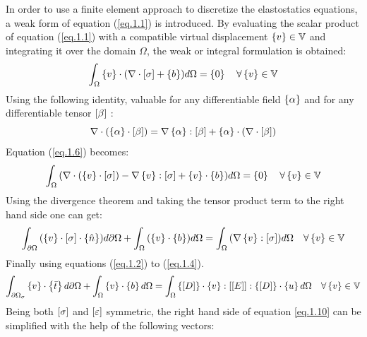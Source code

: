 In order to use a finite element approach to discretize the elastostatics equations, a weak form of equation (\ref{eq.1.1}) is introduced.
By evaluating the scalar product of equation (\ref{eq.1.1}) with a compatible virtual displacement $ \left\lbrace{v}\right \rbrace \in \mathbb{V}$ and integrating it over the domain $\Omega$, the weak or integral formulation is obtained:
\begin{eqnarray}
\label{eq.1.6}
\int_{\Omega}{\left\lbrace{v}\right \rbrace \cdot (\nabla \cdot \left[{\sigma}\right] + \left\lbrace{b}\right \rbrace) d\Omega}=\left\lbrace{0}\right \rbrace \quad \forall \left\lbrace{v}\right \rbrace \in \mathbb{V} 
\end{eqnarray}
Using the following identity, valuable for any differentiable field $\left\lbrace{\alpha}\right \rbrace$ and for any differentiable tensor $ \left[{\beta}\right]$ :
\begin{equation}
\label{eq.1.7}
\nabla \cdot (\left\lbrace{\alpha}\right \rbrace \cdot \left[{\beta}\right])=\nabla \left\lbrace{\alpha}\right \rbrace : \left[{\beta}\right]+\left\lbrace{\alpha}\right \rbrace\cdot(\nabla \cdot \left[{\beta}\right])
\end{equation}
Equation (\ref{eq.1.6})  becomes:
\begin{eqnarray}
\label{eq.1.8}
\int_{\Omega}{(\nabla \cdot (\left\lbrace{v}\right \rbrace \cdot \left[{\sigma}\right]) - \nabla \left\lbrace{v}\right \rbrace :\left[{\sigma}\right]  + \left\lbrace{v}\right \rbrace \cdot \left\lbrace{b}\right \rbrace) d\Omega}=\left\lbrace{0}\right \rbrace \quad \forall \left\lbrace{v}\right \rbrace \in \mathbb{V} 
\end{eqnarray}
Using the divergence theorem and taking the tensor product term to the right hand side one can get:
\begin{eqnarray}
\label{eq.1.9}
\int_{\partial \Omega}{(\left\lbrace{v}\right \rbrace \cdot \left[{\sigma}\right]\cdot\left\lbrace{\hat{n}}\right \rbrace )d\partial \Omega}+\int_{\Omega}{(\left\lbrace{v}\right \rbrace \cdot \left\lbrace{b}\right \rbrace) d\Omega}=\int_{\Omega}{(\nabla \left\lbrace{v}\right \rbrace :\left[{\sigma}\right]) d\Omega} \quad \forall \left\lbrace{v}\right \rbrace \in \mathbb{V} 
\end{eqnarray}
Finally using equations (\ref{eq.1.2}) to (\ref{eq.1.4}).
\begin{eqnarray}
\label{eq.1.10}
\int_{\partial \Omega_{\sigma}}{\left\lbrace{v}\right \rbrace \cdot \left\lbrace{\bar{t}}\right \rbrace d\partial \Omega}+\int_{\Omega}{\left\lbrace{v}\right \rbrace \cdot \left\lbrace{b}\right \rbrace d\Omega}=\int_{\Omega}{\left\lbrace{\ensuremath\left[{D}\right]}\right \rbrace\cdot \left\lbrace{v}\right \rbrace :\left[{\left[{E}\right]}\right]:\left\lbrace{\ensuremath\left[{D}\right]}\right \rbrace\cdot \left\lbrace{u}\right \rbrace  d\Omega} \quad \forall \left\lbrace{v}\right \rbrace \in \mathbb{V}
\end{eqnarray}
Being both $\left[{\sigma}\right]$ and $\left[{ 	\varepsilon}\right]$ symmetric, the right hand side of equation \ref{eq.1.10} can be simplified with the help of the following vectors:
